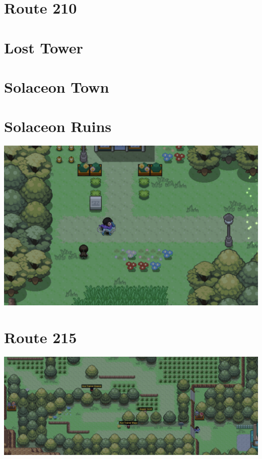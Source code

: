 \documentclass[11pt]{article}
\begin{document}


\section{Route 210}\label{sec:Route_210}

\section{Lost Tower}\label{sec:Lost_Tower}


\section{Solaceon Town}\label{sec:solaceon-town}

\section{Solaceon Ruins}\label{sec:Solaceon_Ruins}


\includegraphics[width=\textwidth]{walkthrough/Sinnoh/Route_210}



\section{Route 215}\label{sec:Route_215}

\includegraphics[width=\textwidth]{walkthrough/Sinnoh/Route_215}
\end{document}
